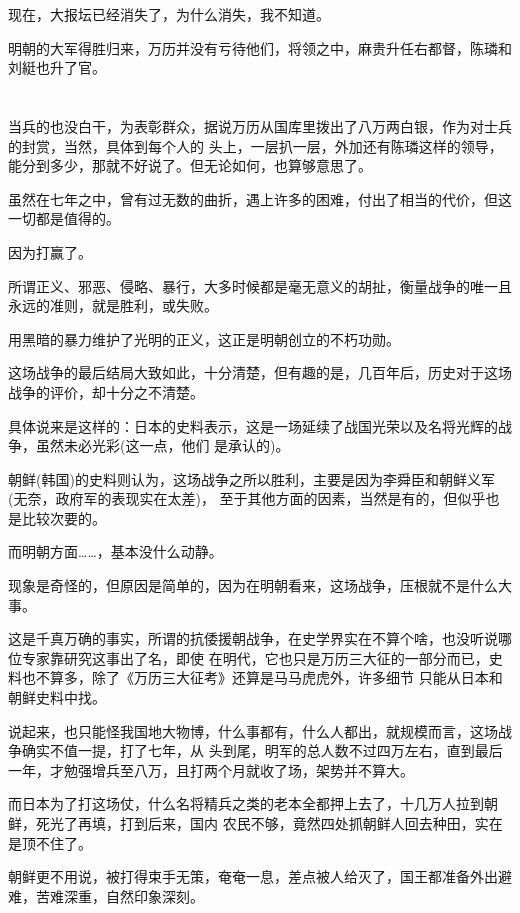 \documentclass[11pt,a4paper,onecolumn]{article}
\begin{document}
现在，大报坛已经消失了，为什么消失，我不知道。

明朝的大军得胜归来，万历并没有亏待他们，将领之中，麻贵升任右都督，陈璘和刘綎也升了官。

\section[\thesection]{}

当兵的也没白干，为表彰群众，据说万历从国库里拨出了八万两白银，作为对士兵的封赏，当然，具体到每个人的
头上，一层扒一层，外加还有陈璘这样的领导，能分到多少，那就不好说了。但无论如何，也算够意思了。

虽然在七年之中，曾有过无数的曲折，遇上许多的困难，付出了相当的代价，但这一切都是值得的。

因为打赢了。

所谓正义、邪恶、侵略、暴行，大多时候都是毫无意义的胡扯，衡量战争的唯一且永远的准则，就是胜利，或失败。

用黑暗的暴力维护了光明的正义，这正是明朝创立的不朽功勋。

这场战争的最后结局大致如此，十分清楚，但有趣的是，几百年后，历史对于这场战争的评价，却十分之不清楚。

具体说来是这样的：日本的史料表示，这是一场延续了战国光荣以及名将光辉的战争，虽然未必光彩(这一点，他们
是承认的)。

朝鲜(韩国)的史料则认为，这场战争之所以胜利，主要是因为李舜臣和朝鲜义军(无奈，政府军的表现实在太差)，
至于其他方面的因素，当然是有的，但似乎也是比较次要的。

而明朝方面……，基本没什么动静。

现象是奇怪的，但原因是简单的，因为在明朝看来，这场战争，压根就不是什么大事。

这是千真万确的事实，所谓的抗倭援朝战争，在史学界实在不算个啥，也没听说哪位专家靠研究这事出了名，即使
在明代，它也只是万历三大征的一部分而已，史料也不算多，除了《万历三大征考》还算是马马虎虎外，许多细节
只能从日本和朝鲜史料中找。

说起来，也只能怪我国地大物博，什么事都有，什么人都出，就规模而言，这场战争确实不值一提，打了七年，从
头到尾，明军的总人数不过四万左右，直到最后一年，才勉强增兵至八万，且打两个月就收了场，架势并不算大。

而日本为了打这场仗，什么名将精兵之类的老本全都押上去了，十几万人拉到朝鲜，死光了再填，打到后来，国内
农民不够，竟然四处抓朝鲜人回去种田，实在是顶不住了。

朝鲜更不用说，被打得束手无策，奄奄一息，差点被人给灭了，国王都准备外出避难，苦难深重，自然印象深刻。
\end{document}
